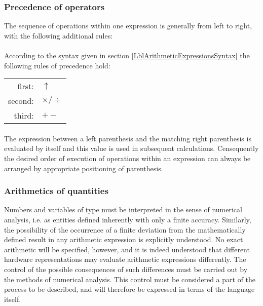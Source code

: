 \documentclass[a4paper,11pt]{article}
\begin{document}
\subsubsection{Precedence of operators}
\label{LblArithmeticExpressionsPrecedence}

The sequence of operations within one expression is generally from
left to right, with the following additional rules:

\paragraph{} \label{LblArithmeticExpressionsPrecedenceP1}
According to the syntax given in section
\ref{LblArithmeticExpressionsSyntax} the following rules of precedence
hold:

\begin{tabular*}{10cm}{rl}
  first:  & $\uparrow$\\
  second: & $\times / \div$\\
  third:  & $+ -$\\
\end{tabular*}

\paragraph{} \label{LblArithmeticExpressionsPrecedenceP2}
The expression between a left parenthesis and the matching right
parenthesis is evaluated by itself and this value is used in
subsequent calculations.  Censequently the desired order of execution
of operations within an expression can always be arranged by
appropriate positioning of parenthesis.

\subsubsection[Arithmetics of real quantities]{Arithmetics of  quantities}
\label{LblArithmeticExpressionsRealQuantities}

Numbers and variables of type  must be interpreted in the
sense of numerical analysis, i.e.  as entities defined inherently with
only a finite accuracy.  Similarly, the possibility of the occurrence
of a finite deviation from the mathematically defined result in any
arithmetic expression is explicitly understood.  No exact arithmetic
will be specified, however, and it is indeed understood that different
hardware representations may evaluate arithmetic expressions
differently.  The control of the possible consequences of such
differences must be carried out by the methods of numerical analysis.
This control must be considered a part of the process to be described,
and will therefore be expressed in terms of the language
itself.
\end{document}
